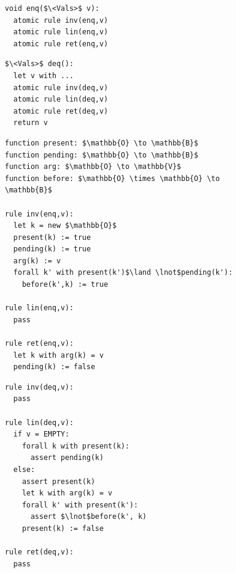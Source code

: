\begin{figure}[t]
\hspace{-10mm}
\begin{minipage}[t]{7.5cm}
\begin{lstlisting}
void enq($\<Vals>$ v):
  atomic rule inv(enq,v)
  atomic rule lin(enq,v)
  atomic rule ret(enq,v)

\end{lstlisting}
\end{minipage}
\begin{minipage}[t]{7.5cm}
\begin{lstlisting}
$\<Vals>$ deq():
  let v with ...
  atomic rule inv(deq,v)
  atomic rule lin(deq,v)
  atomic rule ret(deq,v)
  return v

\end{lstlisting}
\end{minipage}

\begin{minipage}[t]{7.5cm}
\vspace{-3mm}
\begin{lstlisting}
function present: $\mathbb{O} \to \mathbb{B}$
function pending: $\mathbb{O} \to \mathbb{B}$
function arg: $\mathbb{O} \to \mathbb{V}$
function before: $\mathbb{O} \times \mathbb{O} \to \mathbb{B}$

rule inv(enq,v):
  let k = new $\mathbb{O}$
  present(k) := true
  pending(k) := true
  arg(k) := v
  forall k' with present(k')$\land \lnot$pending(k'):
    before(k',k) := true

rule lin(enq,v):
  pass

rule ret(enq,v):
  let k with arg(k) = v
  pending(k) := false

\end{lstlisting}
\end{minipage}
\begin{minipage}[t]{5cm}
\vspace{-3mm}
\begin{lstlisting}
rule inv(deq,v):
  pass

rule lin(deq,v):
  if v = EMPTY:
    forall k with present(k):
      assert pending(k)
  else:
    assert present(k)
    let k with arg(k) = v
    forall k' with present(k'):
      assert $\lnot$before(k', k)
    present(k) := false

rule ret(deq,v):
  pass

\end{lstlisting}
\end{minipage}



\end{figure}
